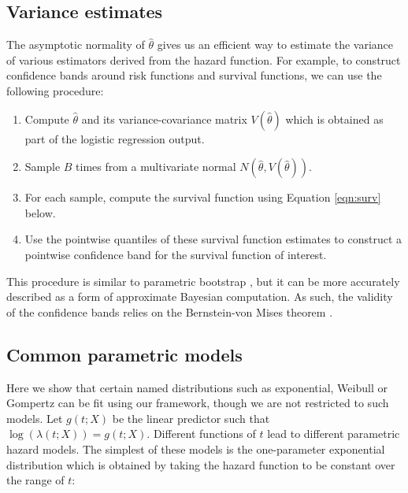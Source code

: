 \hypertarget{variance-estimates}{%
\subsection{Variance estimates}\label{variance-estimates}}

The asymptotic normality of \(\hat{\theta}\) gives us an efficient way
to estimate the variance of various estimators derived from the hazard
function. For example, to construct confidence bands around risk
functions and survival functions, we can use the following procedure:

\begin{enumerate}
\def\labelenumi{\arabic{enumi}.}
\tightlist
\item
  Compute \(\hat{\theta}\) and its variance-covariance matrix
  \(V(\hat \theta)\) which is obtained as part of the logistic
  regression output.
\item
  Sample \(B\) times from a multivariate normal
  \(N\left(\hat{\theta}, V(\hat\theta)\right)\).
\item
  For each sample, compute the survival function using Equation
  \ref{eqn:surv} below.
\item
  Use the pointwise quantiles of these survival function estimates to
  construct a pointwise confidence band for the survival function of
  interest.
\end{enumerate}

This procedure is similar to parametric bootstrap \citep[Section
6.5]{efron1994introduction}, but it can be more accurately described as
a form of approximate Bayesian computation. As such, the validity of the
confidence bands relies on the Bernstein-von Mises theorem
\citep[Chapter 10]{van2000asymptotic}.

\hypertarget{common-parametric-models}{%
\subsection{Common parametric models}\label{common-parametric-models}}

Here we show that certain named distributions such as exponential,
Weibull or Gompertz can be fit using our framework, though we are not
restricted to such models. Let \(g(t; X)\) be the linear predictor such
that \(\log(\lambda(t;X)) = g(t; X)\). Different functions of \(t\) lead
to different parametric hazard models. The simplest of these models is
the one-parameter exponential distribution which is obtained by taking
the hazard function to be constant over the range of \(t\):

